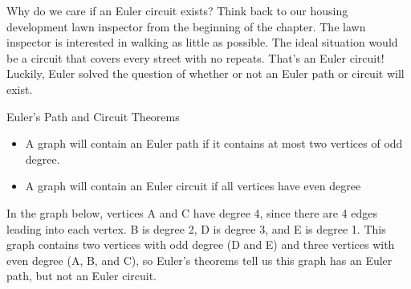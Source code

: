 Why do we care if an Euler circuit exists?  Think back to our housing development lawn inspector from the beginning of the chapter.  The lawn inspector is interested in walking as little as possible.  The ideal situation would be a circuit that covers every street with no repeats.  That's an Euler circuit!  Luckily, Euler solved the question of whether or not an Euler path or circuit will exist.


\begin{theorem}{Euler's Path and Circuit Theorems}{}
\hspace{3in}
\begin{itemize}
\item A graph will contain an Euler path if it contains at most two vertices of odd degree.
\item A graph will contain an Euler circuit if all vertices have even degree
\end{itemize}
\end{theorem}

\begin{example}{}{}%
In the graph below, vertices A and C have degree 4, since there are 4 edges leading into each vertex.  B is degree 2, D is degree 3, and E is degree 1.  This graph contains two vertices with odd degree (D and E) and three vertices with even degree (A, B, and C), so Euler's theorems tell us this graph has an Euler path, but not an Euler circuit.\\
\end{example}

